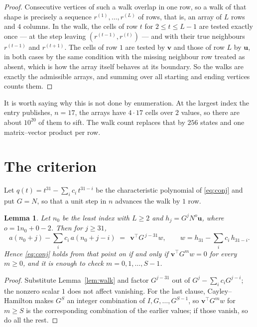 \documentclass[11pt,a4paper]{article}
\theoremstyle{plain}
\newtheorem{lemma}[theorem]{Lemma}
\theoremstyle{definition}
\begin{document}
\begin{proof}
Consecutive vertices of such a walk overlap in one row, so a walk of that shape is
precisely a sequence $r^{(1)},\dots,r^{(L)}$ of rows, that is, an array of $L$ rows
and $4$ columns. In the walk, the cells of row $t$ for $2\le t\le L-1$ are tested
exactly once --- at the step leaving $(r^{(t-1)},r^{(t)})$ --- and with their true
neighbours $r^{(t-1)}$ and $r^{(t+1)}$. The cells of row $1$ are tested by
$\mathbf{v}$ and those of row $L$ by $\mathbf{u}$, in both cases by the same condition
with the missing neighbour row treated as absent, which is how the array itself behaves at
its boundary. So the walks are exactly the admissible arrays, and summing over all starting
and ending vertices counts them.
\end{proof}


It is worth saying why this is not done by enumeration. At the largest index the entry
publishes, $n=17$, the arrays have $4\cdot17$ cells over
$2$ values, so there are about $10^{20}$ of them to sift. The
walk count replaces that by $256$ states and one matrix--vector product per row.
\section{The criterion}

Let $q(t)=t^{31}-\sum_i c_i\,t^{31-i}$ be the characteristic polynomial of
\eqref{eq:conj} and put $G=N$, so that a unit step in $n$ advances the walk by
$1$ row.

\begin{lemma}\label{lem:crit}
Let $n_0$ be the least index with $L\ge2$ and $h_j=G^{j}N^{o}\mathbf{u}$, where
$o=1n_0+0-2$. Then for $j\ge31$,
\[
a(n_0+j)-\sum_i c_i\,a(n_0+j-i)\;=\;\,\mathbf{v}^{\!\top}G^{\,j-31}w,
\qquad w=h_{31}-\sum_i c_i\,h_{31-i} .
\]
Hence \eqref{eq:conj} holds from that point on if and only if
$\mathbf{v}^{\!\top}G^{m}w=0$ for every $m\ge0$, and it is enough to check
$m=0,1,\dots,S-1$.
\end{lemma}

\begin{proof}
Substitute Lemma~\ref{lem:walk} and factor $G^{j-31}$ out of
$G^{j}-\sum_ic_iG^{j-i}$; the nonzero scalar $1$ does not affect
vanishing. For the last clause, Cayley--Hamilton makes $G^{S}$ an integer combination of
$I,G,\dots,G^{S-1}$, so $\mathbf{v}^{\!\top}G^{m}w$ for $m\ge S$ is the corresponding
combination of the earlier values; if those vanish, so do all the rest.
\end{proof}
\end{document}
